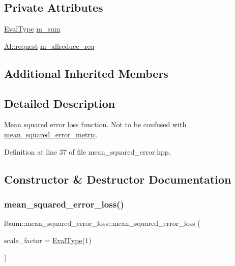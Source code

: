 \subsection*{Private Attributes}
\begin{DoxyCompactItemize}
\item 
\hyperlink{base_8hpp_a3266f5ac18504bbadea983c109566867}{Eval\+Type} \hyperlink{classlbann_1_1mean__squared__error__loss_aae743bb204b7f047967ccd867c00721a}{m\+\_\+sum}
\item 
\hyperlink{structlbann_1_1Al_1_1request}{Al\+::request} \hyperlink{classlbann_1_1mean__squared__error__loss_a24fde367aadff7101900bb845dce775e}{m\+\_\+allreduce\+\_\+req}
\end{DoxyCompactItemize}
\subsection*{Additional Inherited Members}


\subsection{Detailed Description}
Mean squared error loss function. Not to be confused with \hyperlink{classlbann_1_1mean__squared__error__metric}{mean\+\_\+squared\+\_\+error\+\_\+metric}. 

Definition at line 37 of file mean\+\_\+squared\+\_\+error.\+hpp.



\subsection{Constructor \& Destructor Documentation}
\mbox{\label{classlbann_1_1mean__squared__error__loss_a97883c4e1491dcf28f21179b62090c48}} 
\subsubsection{\texorpdfstring{mean\+\_\+squared\+\_\+error\+\_\+loss()}{mean\_squared\_error\_loss()}\hspace{0.1cm}{\footnotesize\ttfamily [1/2]}}
{\footnotesize\ttfamily lbann\+::mean\+\_\+squared\+\_\+error\+\_\+loss\+::mean\+\_\+squared\+\_\+error\+\_\+loss (\begin{DoxyParamCaption}\item[{\hyperlink{base_8hpp_a3266f5ac18504bbadea983c109566867}{Eval\+Type}}]{scale\+\_\+factor = {\ttfamily \hyperlink{base_8hpp_a3266f5ac18504bbadea983c109566867}{Eval\+Type}(1)} }\end{DoxyParamCaption})\hspace{0.3cm}{\ttfamily [inline]}}

